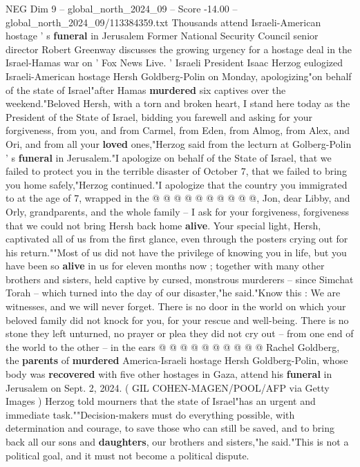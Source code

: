 \begin{textsample}{NEG Dim 9 – global\_north\_2024\_09 – Score -14.00 – global\_north\_2024\_09/113384359.txt}  \label{ex:f9_neg_001}
Thousands attend Israeli-American hostage ' s \textbf{funeral} in Jerusalem Former National Security Council senior director Robert Greenway discusses the growing urgency for a hostage deal in the Israel-Hamas war on ' Fox News Live. ' Israeli President Isaac Herzog eulogized Israeli-American hostage Hersh Goldberg-Polin on Monday, apologizing"on behalf of the state of Israel"after Hamas \textbf{murdered} six captives over the weekend."Beloved Hersh, with a torn and broken heart, I stand here today as the President of the State of Israel, bidding you farewell and asking for your forgiveness, from you, and from Carmel, from Eden, from Almog, from Alex, and Ori, and from all your \textbf{loved} ones,"Herzog said from the lecturn at Golberg-Polin ' s \textbf{funeral} in Jerusalem."I apologize on behalf of the State of Israel, that we failed to protect you in the terrible disaster of October 7, that we failed to bring you home safely,"Herzog continued."I apologize that the country you immigrated to at the age of 7, wrapped in the @ @ @ @ @ @ @ @ @ @, Jon, dear Libby, and Orly, grandparents, and the whole family -- I ask for your forgiveness, forgiveness that we could not bring Hersh back home \textbf{alive}.
Your special light, Hersh, captivated all of us from the first glance, even through the posters crying out for his return.""Most of us did not have the privilege of knowing you in life, but you have been so \textbf{alive} in us for eleven months now ; together with many other brothers and sisters, held captive by cursed, monstrous murderers -- since Simchat Torah -- which turned into the day of our disaster,"he said."Know this : We are witnesses, and we will never forget.
There is no door in the world on which your beloved family did not knock for you, for your rescue and well-being.
There is no stone they left unturned, no prayer or plea they did not cry out -- from one end of the world to the other -- in the ears @ @ @ @ @ @ @ @ @ @ Rachel Goldberg, the \textbf{parents} of \textbf{murdered} America-Israeli hostage Hersh Goldberg-Polin, whose body was \textbf{recovered} with five other hostages in Gaza, attend his \textbf{funeral} in Jerusalem on Sept. 2, 2024. ( GIL COHEN-MAGEN/POOL/AFP via Getty Images ) Herzog told mourners that the state of Israel"has an urgent and immediate task.""Decision-makers must do everything possible, with determination and courage, to save those who can still be saved, and to bring back all our sons and \textbf{daughters}, our brothers and sisters,"he said."This is not a political goal, and it must not become a political dispute.

\end{textsample}

